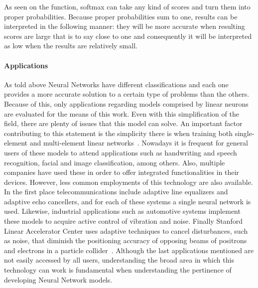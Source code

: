As seen on the  function, softmax can take any kind of scores and turn them into proper probabilities. Because proper probabilities sum to one, results can be interpreted in the following manner: they will be more accurate when resulting scores are large that is to say close to one and consequently it will be interpreted as low when the results are relatively small. 


\paragraph{Applications}

As told above Neural Networks have different classifications and each one provides a more accurate solution to a certain type of problems than the others. Because of this, only applications regarding models comprised by linear neurons are evaluated for the means of this work. Even with this simplification of the field, there are plenty of issues that this model can solve. An important factor contributing to this statement is the simplicity there is when training both single-element and multi-element linear networks~\cite{widrow94}. Nowadays it is frequent for general users of these models to attend applications such as handwriting and speech recognition, facial and image classification, among others. Also, multiple companies have used these in order to offer integrated functionalities in their devices. However, less common employments of this technology are also available. In the first place telecommunications include adaptive line equalizers and adaptive echo cancellers, and for each of these systems a single neural network is used. Likewise, industrial applications such as automotive systems implement these models to acquire active control of vibration and noise. Finally Stanford Linear Accelerator Center uses adaptive techniques to cancel disturbances, such as noise, that diminish the positioning accuracy of opposing beams of positrons and electrons in a particle collider~\cite{widrow94}. Although the last applications mentioned are not easily accessed by all users, understanding the broad area in which this technology can work is fundamental when understanding the pertinence of developing Neural Network models. 


\endinput


